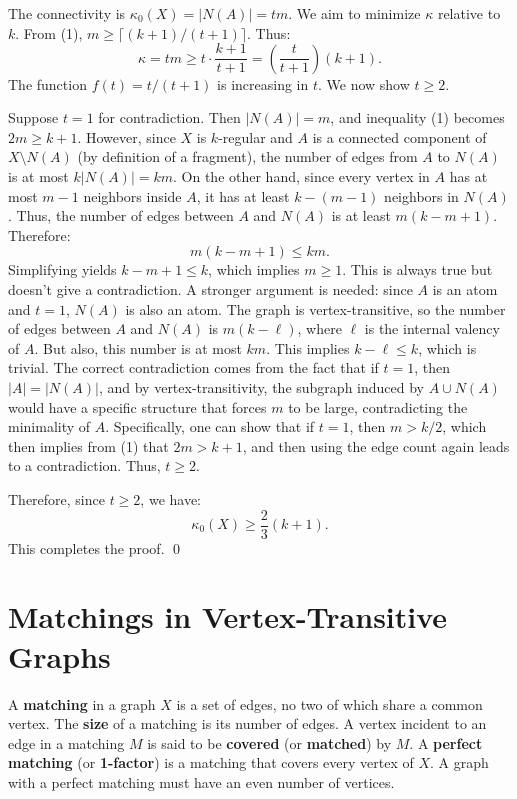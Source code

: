 \documentclass[12pt,a4paper,openany]{book}
\begin{document}
The connectivity is $\kappa_0(X) = |N(A)| = t m$. We aim to minimize $\kappa$ relative to $k$. From (1), $m \geq \lceil (k+1)/(t+1) \rceil$. Thus:
\[
\kappa = t m \geq t \cdot \frac{k+1}{t+1} = \left( \frac{t}{t+1} \right)(k+1).
\]
The function $f(t) = t/(t+1)$ is increasing in $t$. We now show $t \geq 2$.

Suppose $t = 1$ for contradiction. Then $|N(A)| = m$, and inequality (1) becomes $2m \geq k+1$. However, since $X$ is $k$-regular and $A$ is a connected component of $X \setminus N(A)$ (by definition of a fragment), the number of edges from $A$ to $N(A)$ is at most $k|N(A)| = k m$. On the other hand, since every vertex in $A$ has at most $m-1$ neighbors inside $A$, it has at least $k - (m-1)$ neighbors in $N(A)$. Thus, the number of edges between $A$ and $N(A)$ is at least $m(k - m + 1)$. Therefore:
\[
m(k - m + 1) \leq k m.
\]
Simplifying yields $k - m + 1 \leq k$, which implies $m \geq 1$. This is always true but doesn't give a contradiction. A stronger argument is needed: since $A$ is an atom and $t=1$, $N(A)$ is also an atom. The graph is vertex-transitive, so the number of edges between $A$ and $N(A)$ is $m(k - \ell)$, where $\ell$ is the internal valency of $A$. But also, this number is at most $k m$. This implies $k - \ell \leq k$, which is trivial. The correct contradiction comes from the fact that if $t=1$, then $|A| = |N(A)|$, and by vertex-transitivity, the subgraph induced by $A \cup N(A)$ would have a specific structure that forces $m$ to be large, contradicting the minimality of $A$. Specifically, one can show that if $t=1$, then $m > k/2$, which then implies from (1) that $2m > k+1$, and then using the edge count again leads to a contradiction. Thus, $t \geq 2$.

Therefore, since $t \geq 2$, we have:
\[
\kappa_0(X) \geq \frac{2}{3}(k+1).
\]
This completes the proof. \qed

\section{Matchings in Vertex-Transitive Graphs}





A \textbf{matching} in a graph $X$ is a set of edges, no two of which share a common vertex. The \textbf{size} of a matching is its number of edges. A vertex incident to an edge in a matching $M$ is said to be \textbf{covered} (or \textbf{matched}) by $M$. A \textbf{perfect matching} (or \textbf{1-factor}) is a matching that covers every vertex of $X$. A graph with a perfect matching must have an even number of vertices.
\end{document}
